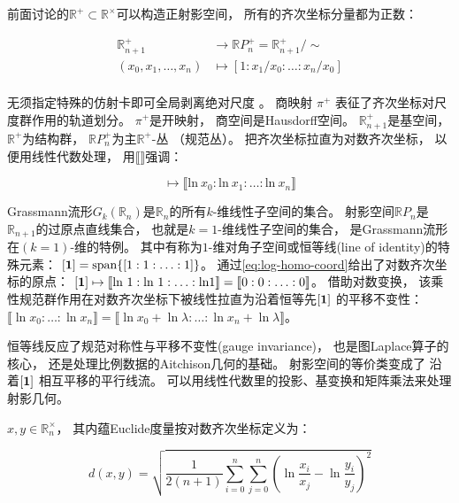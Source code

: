 ﻿\documentclass[10pt,a4paper]{article}
\numberwithin{equation}{section}
\begin{document}
前面讨论的$\mathbb R^+ \subset \mathbb R^\times$可以构造正射影空间，
所有的齐次坐标分量都为正数：

\begin{equation}
\begin{aligned}
\mathbb R_{n+1}^+ &\to \mathbb R P^+_n = \mathbb R_{n+1}^+/\sim \\
(x_0,x_1,\ldots,x_n) &\mapsto [1 : x_1/x_0 : \ldots : x_n/x_0] \\
\end{aligned}
\label{eq:proj-space-positive}
\end{equation}

无须指定特殊的仿射卡即可全局剥离绝对尺度 \cite{Hartshorne1977}。
商映射 $\pi^+$ 表征了齐次坐标对尺度群作用的轨道划分。
$\pi^+$是开映射，
商空间是Hausdorff空间。
$\mathbb R_{n+1}^+$是基空间，
$\mathbb R^+$为结构群，
$\mathbb R P_n^+$为主$\mathbb R^+$-丛 （规范丛）。
把齐次坐标拉直为对数齐次坐标，
以便用线性代数处理，
用$\llbracket\rrbracket$强调：

\begin{equation}
[x_0:x_1:\ldots:x_n] \mapsto \llbracket \text{ln} \ x_0 : \text{ln} \ x_1 : \ldots : \text{ln} \ x_n \rrbracket
\label{eq:log-homo-coord}
\end{equation}

Grassmann流形$G_k(\mathbb R_n)$是$\mathbb R_n$的所有$k$-维线性子空间的集合。
射影空间$\mathbb R P_n$是$\mathbb R_{n+1}$的过原点直线集合，
也就是$k = 1$-维线性子空间的集合，
是Grassmann流形在$(k = 1)$-维的特例。
其中有称为$1$-维对角子空间或恒等线(line of identity)的特殊元素：
$[\textbf 1] = \text{span}\{[1:1:\ldots:1]\}$。
通过\eqref{eq:log-homo-coord}给出了对数齐次坐标的原点：
$[\textbf 1] \mapsto 
\llbracket \text{ln} \ 1 : \text{ln} \ 1 : \ldots : \text{ln} 1 \rrbracket
= \llbracket 0 : 0 : \ldots : 0 \rrbracket $。
借助对数变换，
该乘性规范群作用在对数齐次坐标下被线性拉直为沿着恒等先$[\textbf 1]$ 的平移不变性：
$\llbracket \ln x_0 : \ldots : \ln x_n \rrbracket = \llbracket \ln x_0 + \ln \lambda : \ldots : \ln x_n + \ln \lambda \rrbracket$。

恒等线反应了规范对称性与平移不变性(gauge invariance)，
也是图Laplace算子的核心，
还是处理比例数据的Aitchison几何的基础。
射影空间的等价类变成了
沿着$[\textbf 1]$ 相互平移的平行线流。
可以用线性代数里的投影、基变换和矩阵乘法来处理射影几何。

$x,y\in\mathbb R^\times_n$，
其内蕴Euclide度量按对数齐次坐标定义为：

$$ 
d(x,y) = 
\sqrt{\frac{1}{2(n+1)} \sum_{i=0}^n \sum_{j=0}^n \left( \ln\frac{x_i}{x_j} - \ln\frac{y_i}{y_j} \right)^2} 
$$
\end{document}
